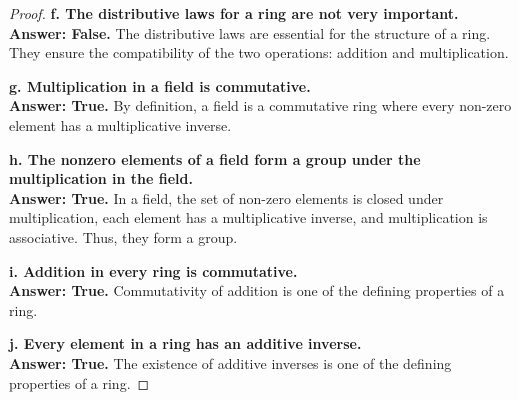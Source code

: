\documentclass[12pt]{amsart}
\theoremstyle{definition}
\numberwithin{equation}{section}
\theoremstyle{plain}
\begin{document}
\begin{exercise}{33}
\begin{proof}
\textbf{f. The distributive laws for a ring are not very important.} \\
\textbf{Answer: False.} The distributive laws are essential for the structure of a ring. They ensure the compatibility of the two operations: addition and multiplication.

\textbf{g. Multiplication in a field is commutative.} \\
\textbf{Answer: True.} By definition, a field is a commutative ring where every non-zero element has a multiplicative inverse.

\textbf{h. The nonzero elements of a field form a group under the multiplication in the field.} \\
\textbf{Answer: True.} In a field, the set of non-zero elements is closed under multiplication, each element has a multiplicative inverse, and multiplication is associative. Thus, they form a group.

\textbf{i. Addition in every ring is commutative.} \\
\textbf{Answer: True.} Commutativity of addition is one of the defining properties of a ring.

\textbf{j. Every element in a ring has an additive inverse.} \\
\textbf{Answer: True.} The existence of additive inverses is one of the defining properties of a ring.
\end{proof}
\vspace*{20pt}
\end{exercise}
\end{document}

